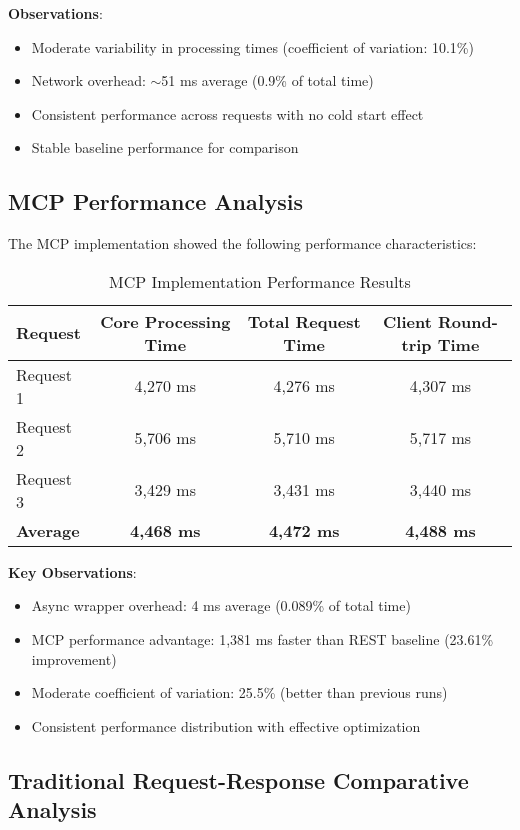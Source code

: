\textbf{Observations}:
\begin{itemize}
    \item Moderate variability in processing times (coefficient of variation: 10.1\%)
    \item Network overhead: $\sim$51 ms average (0.9\% of total time)
    \item Consistent performance across requests with no cold start effect
    \item Stable baseline performance for comparison
\end{itemize}

\subsection{MCP Performance Analysis}

The MCP implementation showed the following performance characteristics:

\begin{table}[h]
\centering
\caption{MCP Implementation Performance Results}
\begin{tabular}{|l|c|c|c|}
\hline
\textbf{Request} & \textbf{Core Processing Time} & \textbf{Total Request Time} & \textbf{Client Round-trip Time} \\
\hline
Request 1 & 4,270 ms & 4,276 ms & 4,307 ms \\
\hline
Request 2 & 5,706 ms & 5,710 ms & 5,717 ms \\
\hline
Request 3 & 3,429 ms & 3,431 ms & 3,440 ms \\
\hline
\textbf{Average} & \textbf{4,468 ms} & \textbf{4,472 ms} & \textbf{4,488 ms} \\
\hline
\end{tabular}
\end{table}

\textbf{Key Observations}:
\begin{itemize}
    \item Async wrapper overhead: 4 ms average (0.089\% of total time)
    \item MCP performance advantage: 1,381 ms faster than REST baseline (23.61\% improvement)
    \item Moderate coefficient of variation: 25.5\% (better than previous runs)
    \item Consistent performance distribution with effective optimization
\end{itemize}

\subsection{Traditional Request-Response Comparative Analysis}

